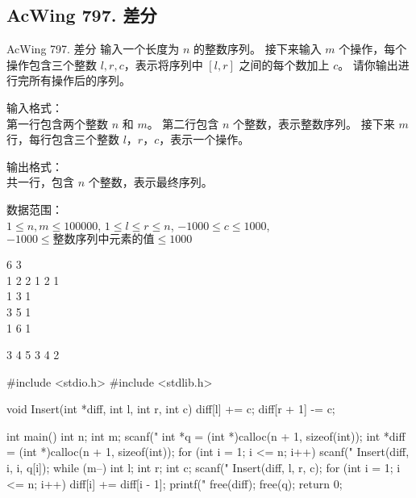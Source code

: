 \subsection{AcWing 797. 差分}
\begin{titledbox}{AcWing 797. 差分}
    输入一个长度为 $n$ 的整数序列。
    接下来输入 $m$ 个操作，每个操作包含三个整数 $l, r, c$，表示将序列中 $[l, r]$ 之间的每个数加上 $c$。
    请你输出进行完所有操作后的序列。

    输入格式：\\
    第一行包含两个整数 $n$ 和 $m$。
    第二行包含 $n$ 个整数，表示整数序列。
    接下来 $m$ 行，每行包含三个整数 $l，r，c$，表示一个操作。

    输出格式：\\
    共一行，包含 $n$ 个整数，表示最终序列。

    数据范围：\\
    $1 \le n,m \le 100000$,
    $1 \le l \le r \le n$,
    $-1000 \le c \le 1000$,
    $-1000 \le \text{整数序列中元素的值} \le 1000$

    \begin{inputblock}
        6 3 \\
        1 2 2 1 2 1 \\
        1 3 1 \\
        3 5 1 \\
        1 6 1 \\
    \end{inputblock}
    \begin{outputblock}
        3 4 5 3 4 2
    \end{outputblock}
\end{titledbox}

\begin{mycpptwocol}[差分]
    #include <stdio.h>
    #include <stdlib.h>

    void Insert(int *diff, int l, int r, int c)
        {
        diff[l] += c;
        diff[r + 1] -= c;
    }

    int main()
        {
        int n;
        int m;
        scanf("%
        int *q = (int *)calloc(n + 1, sizeof(int));
        int *diff = (int *)calloc(n + 1, sizeof(int));
        for (int i = 1; i <= n; i++) {
            scanf("%
            Insert(diff, i, i, q[i]);
        }
        while (m--) {
            int l;
            int r;
            int c;
            scanf("%
            Insert(diff, l, r, c);
        }
        for (int i = 1; i <= n; i++) {
            diff[i] += diff[i - 1];
            printf("%
        }
        free(diff);
        free(q);
        return 0;
    }
\end{mycpptwocol}

